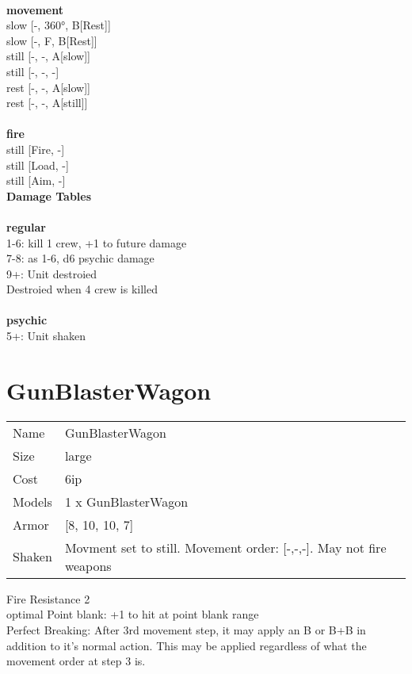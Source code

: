\ \\ {\bf movement } \\
slow [-, 360°, B[Rest]] \\
slow [-, F, B[Rest]] \\
still [-, -, A[slow]] \\
still [-, -, -] \\
rest [-, -, A[slow]] \\
rest [-, -, A[still]] \\
\ \\ {\bf fire } \\
still [Fire, -] \\
still [Load, -] \\
still [Aim, -] \\


{\bf Damage Tables} \\
\ \\ {\bf regular } \\
1-6: kill 1 crew, +1 to future damage \\
7-8: as 1-6, d6 psychic damage \\
9+: Unit destroied \\
Destroied when 4 crew is killed \\
\ \\ {\bf psychic } \\
5+: Unit shaken \\










\pagebreak\pagebreak

\section{ GunBlasterWagon }

\begin{tabular}{ll}
  Name & GunBlasterWagon \\
  Size & large\\
  Cost & 6ip\\
  Models & 1 x GunBlasterWagon\\
  Armor & [8, 10, 10, 7]\\
  Shaken & Movment set to still. Movement order: [-,-,-]. May not fire weapons\\
\end{tabular}

\noindent Fire Resistance 2\\ 
optimal Point blank: +1 to hit at point blank range\\ 
Perfect Breaking: After 3rd movement step, it may apply an B or B+B in addition to it's normal action. This may be applied regardless of what the movement order at step 3 is.\\ 


